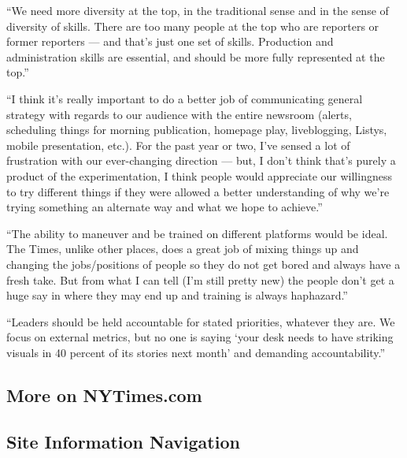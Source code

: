 ``We need more diversity at the top, in the traditional sense and in the
sense of diversity of skills. There are too many people at the top who
are reporters or former reporters --- and that's just one set of skills.
Production and administration skills are essential, and should be more
fully represented at the top.''

``I think it's really important to do a better job of communicating
general strategy with regards to our audience with the entire newsroom
(alerts, scheduling things for morning publication, homepage play,
liveblogging, Listys, mobile presentation, etc.). For the past year or
two, I've sensed a lot of frustration with our ever-changing direction
--- but, I don't think that's purely a product of the experimentation, I
think people would appreciate our willingness to try different things if
they were allowed a better understanding of why we're trying something
an alternate way and what we hope to achieve.''

``The ability to maneuver and be trained on different platforms would be
ideal. The Times, unlike other places, does a great job of mixing things
up and changing the jobs/positions of people so they do not get bored
and always have a fresh take. But from what I can tell (I'm still pretty
new) the people don't get a huge say in where they may end up and
training is always haphazard.''

``Leaders should be held accountable for stated priorities, whatever
they are. We focus on external metrics, but no one is saying `your desk
needs to have striking visuals in 40 percent of its stories next month'
and demanding accountability.''

\hypertarget{more-on-nytimescom}{%
\subsection{More on NYTimes.com}\label{more-on-nytimescom}}

\hypertarget{site-information-navigation}{%
\subsection{Site Information
Navigation}\label{site-information-navigation}}


